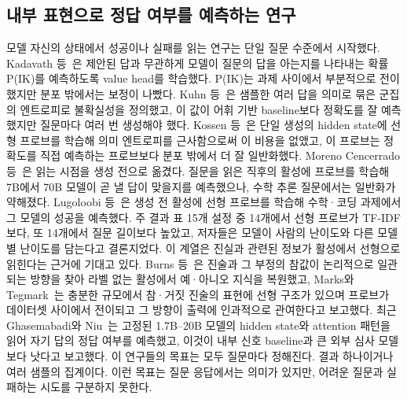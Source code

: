 \documentclass[11pt]{article}
\begin{document}
\subsection{내부 표현으로 정답 여부를 예측하는 연구}
모델 자신의 상태에서 성공이나 실패를 읽는 연구는 단일 질문 수준에서 시작했다. Kadavath 등~\cite{kadavath2022know}은 제안된 답과 무관하게 모델이 질문의 답을 아는지를 나타내는 확률 P(IK)를 예측하도록 value head를 학습했다.
P(IK)는 과제 사이에서 부분적으로 전이했지만 분포 밖에서는 보정이 나빴다. Kuhn 등~\cite{kuhn2023semantic}은 샘플한 여러 답을 의미로 묶은 군집의 엔트로피로 불확실성을 정의했고, 이 값이 어휘 기반 baseline보다 정확도를 잘 예측했지만 질문마다 여러 번 생성해야 했다.
Kossen 등~\cite{kossen2024sep}은 단일 생성의 hidden state에 선형 프로브를 학습해 의미 엔트로피를 근사함으로써 이 비용을 없앴고, 이 프로브는 정확도를 직접 예측하는 프로브보다 분포 밖에서 더 잘 일반화했다.
Moreno Cencerrado 등~\cite{moreno2026noanswer}은 읽는 시점을 생성 전으로 옮겼다. 질문을 읽은 직후의 활성에 프로브를 학습해 7B에서 70B 모델이 곧 낼 답이 맞을지를 예측했으나, 수학 추론 질문에서는 일반화가 약해졌다.
Lugoloobi 등~\cite{lugoloobi2026failures}은 생성 전 활성에 선형 프로브를 학습해 수학·코딩 과제에서 그 모델의 성공을 예측했다. 주 결과 표 15개 설정 중 14개에서 선형 프로브가 TF-IDF보다, 또 14개에서 질문 길이보다 높았고, 저자들은 모델이 사람의 난이도와 다른 모델별 난이도를 담는다고 결론지었다. 이 계열은 진실과 관련된 정보가 활성에서 선형으로 읽힌다는 근거에 기대고 있다. Burns 등~\cite{burns2022latent}은 진술과 그 부정의 참값이 논리적으로 일관되는 방향을 찾아 라벨 없는 활성에서 예·아니오 지식을 복원했고, Marks와 Tegmark~\cite{marks2023geometry}는 충분한 규모에서 참·거짓 진술의 표현에 선형 구조가 있으며 프로브가 데이터셋 사이에서 전이되고 그 방향이 출력에 인과적으로 관여한다고 보고했다. 최근 Ghasemabadi와 Niu~\cite{ghasemabadi2025gnosis}는 고정된 1.7B--20B 모델의 hidden state와 attention 패턴을 읽어 자기 답의 정답 여부를 예측했고, 이것이 내부 신호 baseline과 큰 외부 심사 모델보다 낫다고 보고했다. 이 연구들의 목표는 모두 질문마다 정해진다. 결과 하나이거나 여러 샘플의 집계이다.
이런 목표는 질문 응답에서는 의미가 있지만, 어려운 질문과 실패하는 시도를 구분하지 못한다.
\end{document}
